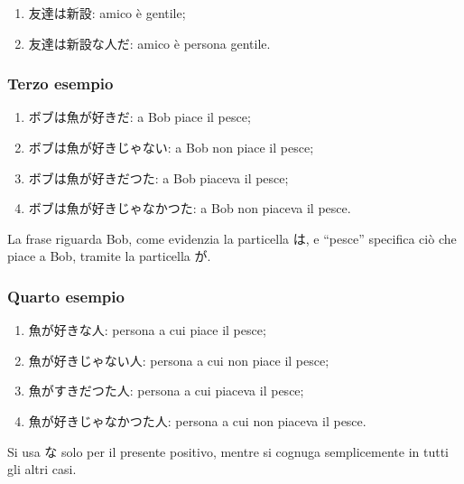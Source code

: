 \documentclass{article}
\let\jap\textjapanese
\begin{document}
                \begin{enumerate}
                    \item \jap{友達は新設}: amico è gentile;
                    \item \jap{友達は新設な人だ}: amico è persona gentile.
                \end{enumerate}

            \subsubsection*{Terzo esempio}

                \begin{enumerate}
                    \item \jap{ボブは魚が好きだ}: a Bob piace il pesce;
                    \item \jap{ボブは魚が好きじゃない}: a Bob non piace il pesce;
                    \item \jap{ボブは魚が好きだつた}: a Bob piaceva il pesce;
                    \item \jap{ボブは魚が好きじゃなかつた}: a Bob non piaceva il pesce.
                \end{enumerate}

                La frase riguarda Bob, come evidenzia la particella \jap{は}, e ``pesce'' specifica ciò che piace a Bob, tramite
                la particella \jap{が}.

            \subsubsection*{Quarto esempio}

                \begin{enumerate}
                    \item \jap{魚が好きな人}: persona a cui piace il pesce;
                    \item \jap{魚が好きじゃない人}: persona a cui non piace il pesce;
                    \item \jap{魚がすきだつた人}: persona a cui piaceva il pesce;
                    \item \jap{魚が好きじゃなかつた人}: persona a cui non piaceva il pesce.
                \end{enumerate}

                Si usa \jap{な} solo per il presente positivo, mentre si cognuga semplicemente in tutti gli altri casi.
\end{document}
